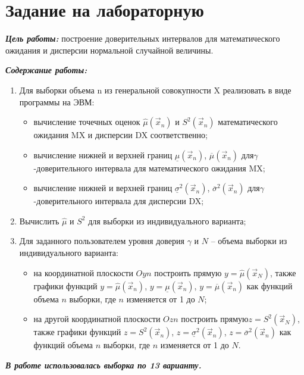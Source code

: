 \chapter{Задание на лабораторную}

\textbf{\textit{Цель работы:}} построение доверительных интервалов для математического ожидания и дисперсии нормальной случайной величины.

\textbf{\textit{Содержание работы:}}
\begin{enumerate}
	\item Для выборки объема n из генеральной совокупности X реализовать в виде программы на ЭВМ:
	\begin{itemize}
		\item вычисление точечных оценок $\hat \mu (\vec x_n)$ и $S^2 (\vec x_n)$ математического ожидания MX и дисперсии DX соответственно;
		\item вычисление нижней и верхней границ $\underline \mu (\vec x_n)$, $\overline \mu (\vec x_n)$ для\newline $\gamma$-доверительного интервала для математического ожидания MX;
		\item вычисление нижней и верхней границ $\underline \sigma^2 (\vec x_n)$, $\overline \sigma^2 (\vec x_n)$ для\newline $\gamma$-доверительного интервала для дисперсии DX;
	\end{itemize}
	\item Вычислить $\hat \mu$ и $S^2$ для выборки из индивидуального варианта;
	\item Для заданного пользователем уровня доверия $\gamma$ и $N$ – объема выборки из индивидуального варианта:
	\begin{itemize}
		\item на координатной плоскости $Oyn$ построить прямую $y = \hat \mu (\vec x_N)$, также графики функций $y = \hat \mu (\vec x_n)$, $y = \underline \mu (\vec x_n)$, $y = \overline \mu (\vec x_n)$ как функций объема $n$ выборки, где $n$ изменяется от 1 до $N$;
		\item на другой координатной плоскости $Ozn$ построить прямую\newline $z = S^2(\vec x_N)$, также графики функций $z = S^2(\vec x_n)$, $z = \underline \sigma^2(\vec x_n)$, $z = \overline \sigma^2(\vec x_n)$ как функций объема $n$ выборки, где $n$ изменяется от 1 до $N$.
	\end{itemize}
\end{enumerate}

\textbf{\textit{В работе использовалась выборка по 13 варианту.}}